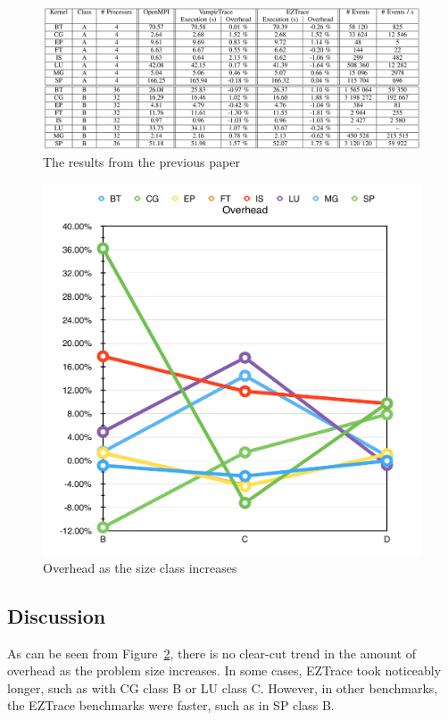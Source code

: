 \documentclass[12pt]{article}
\begin{document}
\begin{figure}[H]
\caption{The results from the previous paper \cite{Trahay2011}}
\label{fig:previous}
\includegraphics[scale=0.6]{eztrace_results}
\centering
\end{figure}

\begin{figure}[H]
\caption{Overhead as the size class increases}
\label{fig:overhead}
\includegraphics[scale=0.5]{overhead_graphs}
\centering
\end{figure}

\subsection{Discussion}

As can be seen from Figure~\ref{fig:overhead}, there is no clear-cut trend in the amount of overhead as the problem size 
increases. In some cases, EZTrace took noticeably longer, such as with CG class B or LU class C. However, in other benchmarks, 
the EZTrace benchmarks were faster, such as in SP class B. 
\end{document}
